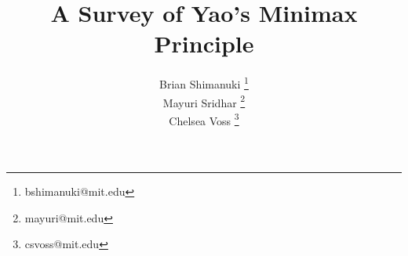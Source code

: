 \documentclass[12pt]{article}
\title{A Survey of Yao's Minimax Principle} %
\author{Brian Shimanuki \footnote{bshimanuki@mit.edu} \\
Mayuri Sridhar \footnote{mayuri@mit.edu} \\
Chelsea Voss \footnote{csvoss@mit.edu}}
\begin{document}
\maketitle









\nocite{*}

\end{document}
